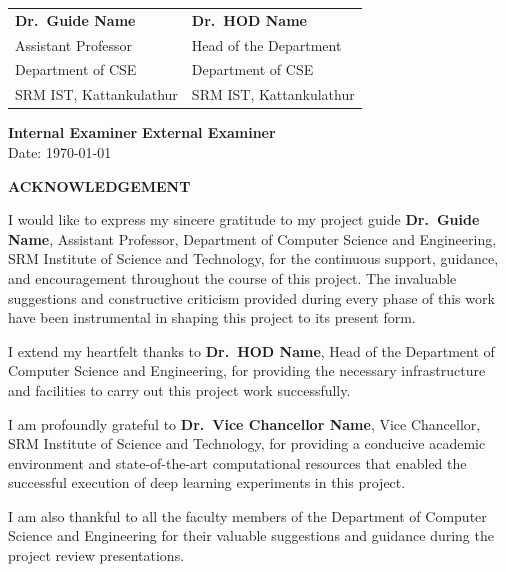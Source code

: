 \documentclass[12pt]{report}
\begin{document}
\vspace{2cm}

\noindent
\begin{tabular}{p{7cm}p{7cm}}
\textbf{Dr.\ Guide Name} & \textbf{Dr.\ HOD Name} \\
Assistant Professor & Head of the Department \\
Department of CSE & Department of CSE \\
SRM IST, Kattankulathur & SRM IST, Kattankulathur \\
\end{tabular}

\vspace{2cm}

\noindent
\textbf{Internal Examiner} \hfill \textbf{External Examiner}\\[1cm]
\noindent
Date: \today

\newpage
\thispagestyle{fancy}
\begin{center}
\textbf{\large ACKNOWLEDGEMENT}
\end{center}
\vspace{1cm}

I would like to express my sincere gratitude to my project guide \textbf{Dr.\ Guide Name}, Assistant Professor, Department of Computer Science and Engineering, SRM Institute of Science and Technology, for the continuous support, guidance, and encouragement throughout the course of this project. The invaluable suggestions and constructive criticism provided during every phase of this work have been instrumental in shaping this project to its present form.

I extend my heartfelt thanks to \textbf{Dr.\ HOD Name}, Head of the Department of Computer Science and Engineering, for providing the necessary infrastructure and facilities to carry out this project work successfully.

I am profoundly grateful to \textbf{Dr.\ Vice Chancellor Name}, Vice Chancellor, SRM Institute of Science and Technology, for providing a conducive academic environment and state-of-the-art computational resources that enabled the successful execution of deep learning experiments in this project.

I am also thankful to all the faculty members of the Department of Computer Science and Engineering for their valuable suggestions and guidance during the project review presentations.
\end{document}
